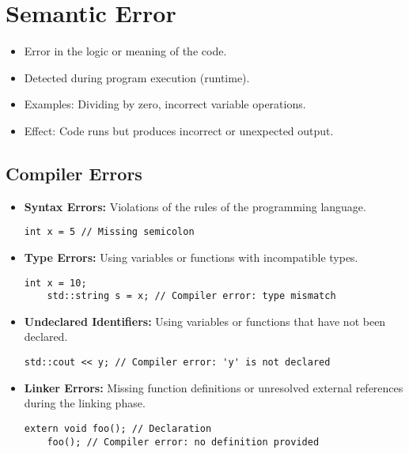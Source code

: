\section{Semantic Error}
\begin{itemize}
    \item Error in the logic or meaning of the code.
    \item Detected during program execution (runtime).
    \item Examples: Dividing by zero, incorrect variable operations.
    \item Effect: Code runs but produces incorrect or unexpected output.
\end{itemize}
\subsection{Compiler Errors}
\begin{itemize}
    \item \textbf{Syntax Errors:} Violations of the rules of the programming language.
    \begin{lstlisting}[style=codeexpert]
    int x = 5 // Missing semicolon
    \end{lstlisting}

    \item \textbf{Type Errors:} Using variables or functions with incompatible types.
    \begin{lstlisting}[style=codeexpert]
    int x = 10;
    std::string s = x; // Compiler error: type mismatch
    \end{lstlisting}

    \item \textbf{Undeclared Identifiers:} Using variables or functions that have not been declared.
    \begin{lstlisting}[style=codeexpert]
    std::cout << y; // Compiler error: 'y' is not declared
    \end{lstlisting}

    \item \textbf{Linker Errors:} Missing function definitions or unresolved external references during the linking phase.
    \begin{lstlisting}[style=codeexpert]
    extern void foo(); // Declaration
    foo(); // Compiler error: no definition provided
    \end{lstlisting}
\end{itemize}




